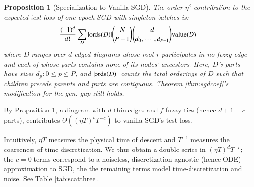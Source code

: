 \documentclass{article}
\theoremstyle{plain}
\newtheorem{prop}{Proposition}
\theoremstyle{definition}
\newtheorem{exm}{Example}
\newcommand{\wrap}[1]{\left(#1\right)}
\newcommand{\dvalue}{\text{\textnormal{value}}}
\newcommand{\ords}{\text{\textnormal{ords}}}
\begin{document}
        \begin{prop}[Specialization to Vanilla SGD] \label{prop:vanilla}
            The order $\eta^d$ contribution to the expected test loss of
            one-epoch SGD with singleton batches is:
            \begin{equation*}\label{eq:sgdbasiccoef}
                \frac{(-1)^d}{d!} \sum_{D} 
                |\ords(D)| {N \choose P-1} {d \choose d_0,\cdots,d_{P-1}}
                \dvalue(D)
            \end{equation*}
            where $D$ ranges over $d$-edged diagrams whose root $r$
            participates in no fuzzy edge and each of whose parts contains
            none of its nodes' ancestors.  Here, $D$'s parts have sizes
            $d_p: 0\leq p\leq P$, and $|\ords(D)|$ counts the total
            orderings of $D$ such that children precede parents and parts are
            contiguous.
            Theorem \ref{thm:sgdcoef}'s modification for the gen. gap still
            holds.
        \end{prop}

        By Proposition \ref{prop:vanilla}, a diagram with $d$ thin edges and
        $f$ fuzzy ties (hence $d+1-c$ parts), contributes $\Theta\wrap{(\eta
        T)^d T^{-c}}$ to vanilla SGD's test loss.  
        
        Intuitively, $\eta T$ measures the physical time of descent and
        $T^{-1}$ measures the coarseness of time discretization.  We thus
        obtain a double series in $(\eta T)^d T^{-c}$; the $c=0$ terms
        correspond to a noiseless, discretization-agnostic (hence ODE)
        approximation to SGD, the the remaining terms model time-discretization
        and noise.  See Table \ref{tab:scatthree}. 

\end{document}
